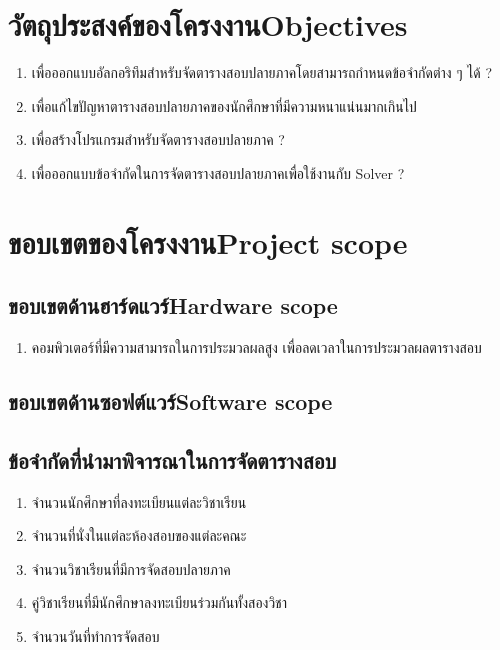 \section{\ifcpe วัตถุประสงค์ของโครงงาน\else Objectives\fi}
\begin{enumerate}
    \item เพื่อออกแบบอัลกอริทึมสำหรับจัดตารางสอบปลายภาคโดยสามารถกำหนดข้อจำกัดต่าง ๆ ได้ ?
    \item เพื่อแก้ไขปัญหาตารางสอบปลายภาคของนักศึกษาที่มีความหนาแน่นมากเกินไป
    \item เพื่อสร้างโปรแกรมสำหรับจัดตารางสอบปลายภาค ? 
    \item เพื่อออกแบบข้อจำกัดในการจัดตารางสอบปลายภาคเพื่อใช้งานกับ Solver ? 
\end{enumerate}

\section{\ifcpe ขอบเขตของโครงงาน\else Project scope\fi}

\subsection{\ifcpe ขอบเขตด้านฮาร์ดแวร์\else Hardware scope\fi}
\begin{enumerate}
    \item คอมพิวเตอร์ที่มีความสามารถในการประมวลผลสูง เพื่อลดเวลาในการประมวลผลตารางสอบ
\end{enumerate}
\subsection{\ifcpe ขอบเขตด้านซอฟต์แวร์\else Software scope\fi}
\subsection{ข้อจำกัดที่นำมาพิจารณาในการจัดตารางสอบ}
\begin{enumerate}
    \item จำนวนนักศึกษาที่ลงทะเบียนแต่ละวิชาเรียน
    \item จำนวนที่นั่งในแต่ละห้องสอบของแต่ละคณะ
    \item จำนวนวิชาเรียนที่มีการจัดสอบปลายภาค
    \item คู่วิชาเรียนที่มีนักศึกษาลงทะเบียนร่วมกันทั้งสองวิชา
    \item จำนวนวันที่ทำการจัดสอบ
\end{enumerate}

